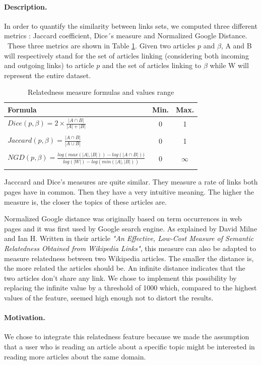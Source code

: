 \paragraph{Description.}
In order to quantify the similarity between links sets, we computed three different metrics  : Jaccard coefficient, Dice\'\ s measure and Normalized Google Distance. \
These three metrics are shown in Table \ref{fig:formulas}. Given two articles $p$ and $\beta$, A and B will respectively stand for the set of articles linking (considering both incoming and outgoing links) to article $p$ and the set of articles linking to $\beta$ while W will represent the entire dataset.
\begin{table}[H]
\caption{Relatedness measure formulas and values range}
\centering
\begin{tabular}{lcc}
\toprule
Formula & Min. & Max.\\
\midrule
$Dice(p ,\beta)=2\times\frac{|A \cap B|}{|A| + |B|}$ & 0 & 1 \\
 & & \\
$Jaccard(p ,\beta)= \frac{|A\cap B|}{|A\cup B|}$ & 0 & 1 \\
 & & \\
$NGD(p ,\beta)= \frac{log(max(|A|,|B|))-log(|A\cap B|))}{log(|W|)-log(min(|A|,|B|))}$ & 0 & $\infty $ \\
\bottomrule
\label{fig:formulas}
\end{tabular}
\end{table}
Jacccard and Dice's measures are quite similar. They measure a rate of links both pages have in common.  Then they have a very intuitive meaning. The higher the measure is, the closer the topics of these articles are.

Normalized Google distance was originally based on term occurrences in web pages and it was first used by Google search engine. As explained by David Milne and Ian H. Written in their article \textit{"An Effective, Low-Cost Measure of Semantic Relatedness Obtained from Wikipedia Links"}\cite{learning_link}, this measure can also be adapted to measure relatedness between two Wikipedia articles. The smaller the distance is, the more related the articles should be. An infinite distance indicates that the two articles don't share any link. We chose to implement this possibility by replacing the infinite value by a threshold of 1000 which, compared to the highest values of the feature, seemed high enough not to distort the results.
\paragraph{Motivation.}
We chose to integrate this relatedness feature because we made the assumption that a user who is reading an article about a specific topic might be interested in reading more articles about the same domain. 
